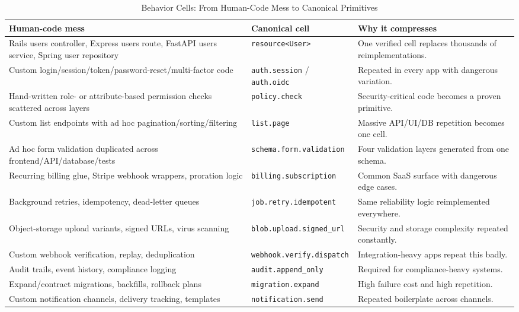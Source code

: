 \begin{table}[t]
\caption{Behavior Cells: From Human-Code Mess to Canonical Primitives}
\label{tab:cells}
\centering
\footnotesize
\begin{tabularx}{\textwidth}{p{}p{}X}
\toprule
Human-code mess & Canonical cell & Why it compresses \\
\midrule
Rails users controller, Express users route, FastAPI users service, Spring user repository & \texttt{resource<User>} & One verified cell replaces thousands of reimplementations. \\
Custom login/session/token/password-reset/multi-factor code & \texttt{auth.session} / \texttt{auth.oidc} & Repeated in every app with dangerous variation. \\
Hand-written role- or attribute-based permission checks scattered across layers & \texttt{policy.check} & Security-critical code becomes a proven primitive. \\
Custom list endpoints with ad hoc pagination/sorting/filtering & \texttt{list.page} & Massive API/UI/DB repetition becomes one cell. \\
Ad hoc form validation duplicated across frontend/API/database/tests & \texttt{schema.form.validation} & Four validation layers generated from one schema. \\
Recurring billing glue, Stripe webhook wrappers, proration logic & \texttt{billing.subscription} & Common SaaS surface with dangerous edge cases. \\
Background retries, idempotency, dead-letter queues & \texttt{job.retry.idempotent} & Same reliability logic reimplemented everywhere. \\
Object-storage upload variants, signed URLs, virus scanning & \texttt{blob.upload.signed\_url} & Security and storage complexity repeated constantly. \\
Custom webhook verification, replay, deduplication & \texttt{webhook.verify.dispatch} & Integration-heavy apps repeat this badly. \\
Audit trails, event history, compliance logging & \texttt{audit.append\_only} & Required for compliance-heavy systems. \\
Expand/contract migrations, backfills, rollback plans & \texttt{migration.expand} & High failure cost and high repetition. \\
Custom notification channels, delivery tracking, templates & \texttt{notification.send} & Repeated boilerplate across channels. \\
\bottomrule
\end{tabularx}
\end{table}


